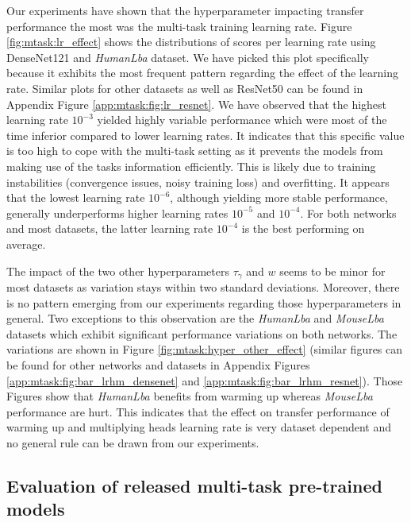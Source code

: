 Our experiments have shown that the hyperparameter impacting transfer performance the most was the multi-task training learning rate. Figure \ref{fig:mtask:lr_effect} shows the distributions of scores per learning rate using DenseNet121 and \textit{HumanLba} dataset. We have picked this plot specifically because it exhibits the most frequent pattern regarding the effect of the learning rate. Similar plots for other datasets as well as ResNet50 can be found in Appendix Figure \ref{app:mtask:fig:lr_resnet}. We have observed that the highest learning rate $10^{-3}$ yielded highly variable performance which were most of the time inferior compared to lower learning rates. It indicates that this specific value is too high to cope with the multi-task setting as it prevents the models from making use of the tasks information efficiently. This is likely due to training instabilities (convergence issues, noisy training loss) and overfitting. It appears that the lowest learning rate $10^{-6}$, although yielding more stable performance, generally underperforms higher learning rates $10^{-5}$ and $10^{-4}$. For both networks and most datasets, the latter learning rate $10^{-4}$ is the best performing on average.

The impact of the two other hyperparameters $\tau_\gamma$ and $w$ seems to be minor for most datasets as variation stays within two standard deviations. Moreover, there is no pattern emerging from our experiments regarding those hyperparameters in general. Two exceptions to this observation are the \textit{HumanLba} and \textit{MouseLba} datasets which exhibit significant performance variations on both networks. The variations are shown in Figure \ref{fig:mtask:hyper_other_effect} (similar figures can be found for other networks and datasets in Appendix Figures \ref{app:mtask:fig:bar_lrhm_densenet} and \ref{app:mtask:fig:bar_lrhm_resnet}). Those Figures show that \textit{HumanLba} benefits from warming up whereas \textit{MouseLba} performance are hurt. This indicates that the effect on transfer performance of warming up and multiplying heads learning rate is very dataset dependent and no general rule can be drawn from our experiments.

\subsection{Evaluation of released multi-task pre-trained models}
\label{ssec:mtask:breakhis_eval}

